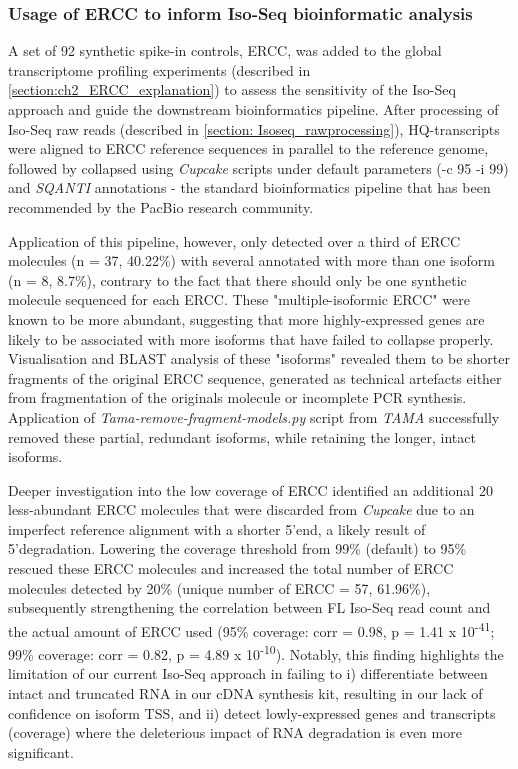 \subsubsection{Usage of ERCC to inform Iso-Seq bioinformatic analysis}
A set of 92 synthetic spike-in controls, ERCC, was added to the global transcriptome profiling experiments (described in \cref{section:ch2_ERCC_explanation}) to assess the sensitivity of the Iso-Seq approach and guide the downstream bioinformatics pipeline. After processing of Iso-Seq raw reads (described in \cref{section: Isoseq_rawprocessing}), HQ-transcripts were aligned to ERCC reference sequences in parallel to the reference genome, followed by collapsed using \textit{Cupcake} scripts under default parameters (-c 95 -i 99) and \textit{SQANTI} annotations - the standard bioinformatics pipeline that has been recommended by the PacBio research community. 

Application of this pipeline, however, only detected over a third of ERCC molecules (n = 37, 40.22\%) with several annotated with more than one isoform (n = 8, 8.7\%), contrary to the fact that there should only be one synthetic molecule sequenced for each ERCC. These "multiple-isoformic ERCC" were known to be more abundant, suggesting that more highly-expressed genes are likely to be associated with more isoforms that have failed to collapse properly. Visualisation and BLAST analysis of these "isoforms" revealed them to be shorter fragments of the original ERCC sequence, generated as technical artefacts either from fragmentation of the originals molecule or incomplete PCR synthesis. Application of \textit{Tama-remove-fragment-models.py} script from \textit{TAMA}\cite{Kuo2017} successfully removed these partial, redundant isoforms, while retaining the longer, intact isoforms. 

Deeper investigation into the low coverage of ERCC identified an additional 20 less-abundant ERCC molecules that were 
discarded from \textit{Cupcake} due to an imperfect reference alignment with a shorter 5'end, a likely result of 5'degradation. Lowering the coverage threshold from 99\% (default) to 95\% rescued these ERCC molecules and increased the total number of ERCC molecules detected by 20\% (unique number of ERCC = 57, 61.96\%), subsequently strengthening the correlation between FL Iso-Seq read count and the actual amount of ERCC used (95\% coverage: corr = 0.98, p = 1.41 x 10\textsuperscript{-41}; 99\% coverage: corr = 0.82, p = 4.89 x 10\textsuperscript{-10}). Notably, this finding highlights the limitation of our current Iso-Seq approach in failing to i) differentiate between intact and truncated RNA in our cDNA synthesis kit, resulting in our lack of confidence on isoform TSS, and ii) detect lowly-expressed genes and transcripts (coverage) where the deleterious impact of RNA degradation is even more significant. 
